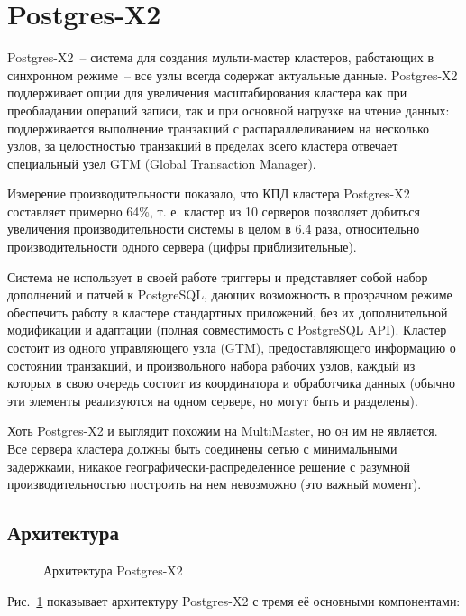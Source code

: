 \section{Postgres-X2}
\label{sec:postgres-x2}

Postgres-X2~-- система для создания мульти-мастер кластеров, работающих в синхронном режиме~-- все узлы всегда содержат актуальные данные. Postgres-X2 поддерживает опции для увеличения масштабирования кластера как при преобладании операций записи, так и при основной нагрузке на чтение данных: поддерживается выполнение транзакций с распараллеливанием на несколько узлов, за целостностью транзакций в пределах всего кластера отвечает специальный узел GTM (Global Transaction Manager).

Измерение производительности показало, что КПД кластера Postgres-X2 составляет примерно 64\%, т. е. кластер из 10 серверов позволяет добиться увеличения производительности системы в целом в 6.4 раза, относительно производительности одного сервера (цифры приблизительные).

Система не использует в своей работе триггеры и представляет собой набор дополнений и патчей к PostgreSQL, дающих возможность в прозрачном режиме обеспечить работу в кластере стандартных приложений, без их дополнительной модификации и адаптации (полная совместимость с PostgreSQL API). Кластер состоит из одного управляющего узла (GTM), предоставляющего информацию о состоянии транзакций, и произвольного набора рабочих узлов, каждый из которых в свою очередь состоит из координатора и обработчика данных (обычно эти элементы реализуются на одном сервере, но могут быть и разделены).

Хоть Postgres-X2 и выглядит похожим на MultiMaster, но он им не является. Все сервера кластера должны быть соединены сетью с минимальными задержками, никакое географически-распределенное решение с разумной производительностью построить на нем невозможно (это важный момент).

\subsection{Архитектура}
\label{sec:postgres-x2-architecture}

\begin{figure}[ht!]
  \caption{Архитектура Postgres-X2}
  \label{fig:postgres-x21}
\end{figure}

Рис.~\ref{fig:postgres-x21} показывает архитектуру Postgres-X2 с тремя её основными компонентами:

